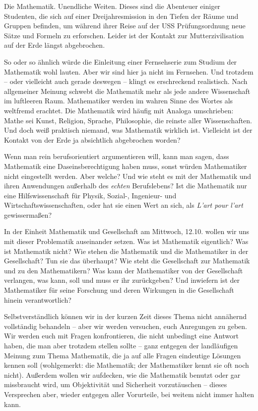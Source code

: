 Die Mathematik. Unendliche Weiten. Dieses sind die Abenteuer einiger
Studenten, die sich auf einer Dreijahresmission in den Tiefen der Räume und
Gruppen befinden, um während ihrer Reise auf der USS Prüfungsordnung neue Sätze
und Formeln zu erforschen. Leider ist der Kontakt zur Mutterzivilisation auf
der Erde längst abgebrochen.

So oder so ähnlich würde die Einleitung einer Fernsehserie zum Studium der
Mathematik wohl lauten. Aber wir sind hier ja nicht im Fernsehen. Und trotzdem
-- oder vielleicht auch gerade deswegen -- klingt es erschreckend realistisch.
Nach allgemeiner Meinung schwebt die Mathematik mehr als jede andere
Wissenschaft im luftleeren Raum. Mathematiker werden im wahren Sinne des Wortes
als weltfremd erachtet. Die Mathematik wird häufig mit Analoga umschrieben:
Mathe sei Kunst, Religion, Sprache, Philosophie, die reinste aller
Wissenschaften. Und doch weiß praktisch niemand, was Mathematik wirklich ist.
Vielleicht ist der Kontakt von der Erde ja absichtlich abgebrochen worden?

Wenn man rein berufsorientiert argumentieren will, kann man sagen, dass
Mathematik eine Daseinsberechtigung haben muss, sonst würden Mathematiker nicht
eingestellt werden. Aber welche? Und wie steht es mit der Mathematik und ihren
Anwendungen außerhalb des \emph{echten} Berufslebens? Ist die Mathematik nur
eine Hilfswissenschaft für Physik, Sozial-, Ingenieur- und
Wirtschaftswissenschaften, oder hat sie einen Wert an sich, als \emph{L'art
pour l'art} gewissermaßen?


In der Einheit Mathematik und Gesellschaft am Mittwoch, 12.10. wollen wir uns
mit dieser Problematik auseinander setzen. Was ist Mathematik eigentlich? Was
ist Mathematik nicht? Wie stehen die Mathematik und die Mathematiker in der
Gesellschaft? Tun sie das überhaupt? Wie steht die Gesellschaft zur Mathematik
und zu den Mathematikern? Was kann der Mathematiker von der Gesellschaft
verlangen, was kann, soll und muss er ihr zurückgeben? Und inwiefern ist der
Mathematiker für seine Forschung und deren Wirkungen in die Gesellschaft hinein
verantwortlich?

Selbstverständlich können wir in der kurzen Zeit dieses Thema nicht annähernd
vollständig behandeln -- aber wir werden versuchen, euch Anregungen zu geben.
Wir werden euch mit Fragen konfrontieren, die nicht unbedingt eine Antwort
haben, die man aber trotzdem stellen sollte -- ganz entgegen der landläufigen
Meinung zum Thema Mathematik, die ja auf alle Fragen eindeutige Lösungen kennen
soll (wohlgemerkt: die Mathematik; der Mathematiker kennt sie oft noch nicht).
Außerdem wollen wir aufdecken, wie die Mathematik benutzt oder gar missbraucht
wird, um Objektivität und Sicherheit vorzutäuschen -- dieses Versprechen aber,
wieder entgegen aller Vorurteile, bei weitem nicht immer halten kann.

